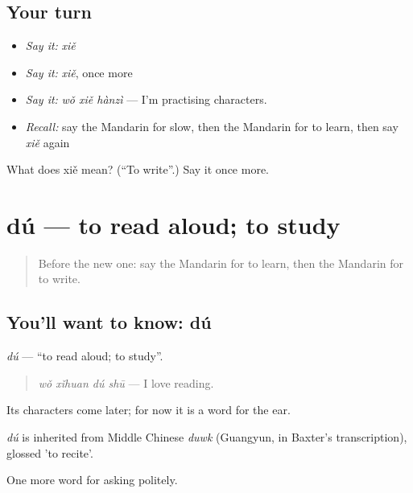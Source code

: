 \subsection*{Your turn}
\begin{itemize}
\raggedright
  \item \emph{Say it:} \emph{xiě}
  \item \emph{Say it:} \emph{xiě}, once more
  \item \emph{Say it:} \emph{wǒ xiě hànzì} — I'm practising characters.
  \item \emph{Recall:} say the Mandarin for slow, then the Mandarin for to learn, then say \emph{xiě} again
\end{itemize}

\begin{tcolorbox}[breakable,colback=teal!4,colframe=teal!35!black,title={Before you move on}]
What does xiě mean? (\textquotedblleft{}To write\textquotedblright{}.) Say it once more.
\end{tcolorbox}
\section[dú]{dú — to read aloud; to study}

\label{lesson:ZH-C54-du}



\begin{quote}
Before the new one: say the Mandarin for to learn, then the Mandarin for to write.
\end{quote}

\subsection*{You'll want to know: dú}
\emph{dú} — \textquotedblleft{}to read aloud; to study\textquotedblright{}.

\begin{quote}
\emph{wǒ xǐhuan dú shū} — I love reading.
\end{quote}

Its characters come later; for now it is a word for the ear.

\begin{cousinweb}
\emph{dú} is inherited from Middle Chinese \emph{duwk} (Guangyun, in Baxter's transcription), glossed 'to recite'.
\end{cousinweb}

\begin{grammarlens}[title={What you've built}]
One more word for asking politely.
\end{grammarlens}

